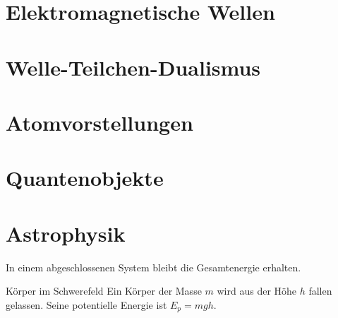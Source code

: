 \documentclass[11pt,a4paper,oneside]{article}
\begin{document}
	
	
	\newpage
	
	\section{Elektromagnetische Wellen}

	\section{Welle-Teilchen-Dualismus}
	\section{Atomvorstellungen}
	
	
	\section{Quantenobjekte}
	\section{Astrophysik}
	
	
	\newpage
	
	
	
	
	
	
	\newpage
	
	
	
	
	
	
	
	\begin{theo}
		In einem abgeschlossenen System bleibt die Gesamtenergie erhalten.
	\end{theo}
	
	\begin{exem}{Körper im Schwerefeld}
		Ein Körper der Masse $m$ wird aus der Höhe $h$ fallen gelassen. Seine potentielle Energie ist $E_p = mgh$.
	\end{exem}
	
\end{document}
